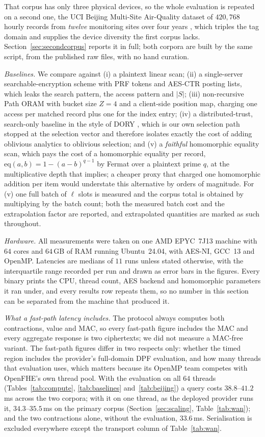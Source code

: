 \documentclass[a4paper,fleqn]{cas-dc}
\begin{document}
That corpus has only three physical devices, so the whole evaluation is
repeated on a second one, the UCI Beijing Multi-Site Air-Quality dataset of
$420{,}768$ hourly records from \emph{twelve} monitoring sites over four years
\citep{zhang2017cautionary}, which triples the tag domain and supplies the
device diversity the first corpus lacks. Section~\ref{sec:secondcorpus}
reports it in full; both corpora are built by the same script, from the
published raw files, with no hand curation.

\emph{Baselines.} We compare against (i) a plaintext linear scan; (ii) a
single-server searchable-encryption scheme with PRF tokens and AES-CTR posting
lists, which leaks the search pattern, the access pattern and $|S|$; (iii)
non-recursive Path ORAM with bucket size $Z=4$ and a client-side position map,
charging one access per matched record plus one for the index entry; (iv) a
distributed-trust, search-only baseline in the style of DORY \citep{dory},
which is our own selection path stopped at the selection vector and therefore
isolates exactly the cost of adding oblivious analytics to oblivious
selection; and (v) a \emph{faithful} homomorphic equality scan, which pays the
cost of a homomorphic equality per record,
$\mathrm{eq}(a,b)=1-(a-b)^{q-1}$ by Fermat over a plaintext prime $q$, at the
multiplicative depth that implies; a cheaper proxy that charged one
homomorphic addition per item would understate this alternative by orders of
magnitude. For (v) one full batch of $\ell$ slots is measured and the corpus
total is obtained by multiplying by the batch count; both the measured batch
cost and the extrapolation factor are reported, and extrapolated quantities
are marked as such throughout.

\emph{Hardware.} All measurements were taken on one AMD EPYC~7J13 machine with
$64$ cores and $64$\,GB of RAM running Ubuntu~24.04, with AES-NI, GCC~13 and
OpenMP. Latencies are medians of $11$ runs unless stated otherwise, with the
interquartile range recorded per run and drawn as error bars in the
figures. Every binary prints the CPU, thread count, AES backend and
homomorphic parameters it ran under, and every results row repeats them, so no
number in this section can be separated from the machine that produced it.

\emph{What a fast-path latency includes.} The protocol always computes both
contractions, value and MAC, so every fast-path figure includes the MAC and
every aggregate response is two ciphertexts; we did not measure a MAC-free
variant. The fast-path figures differ in two respects only: whether the timed
region includes the provider's full-domain DPF evaluation, and how many
threads that evaluation uses, which matters because its OpenMP team competes
with OpenFHE's own thread pool. With the evaluation on all $64$ threads
(Tables~\ref{tab:compute}, \ref{tab:baselines} and~\ref{tab:beijing}) a query
costs $38.8$--$41.2$\,ms across the two corpora; with it on one thread, as the
deployed provider runs it, $34.3$--$35.5$\,ms on the primary corpus
(Section~\ref{sec:scaling}, Table~\ref{tab:wan}); and the two contractions
alone, without the evaluation, $33.6$\,ms. Serialisation is excluded
everywhere except the transport column of Table~\ref{tab:wan}.
\end{document}
